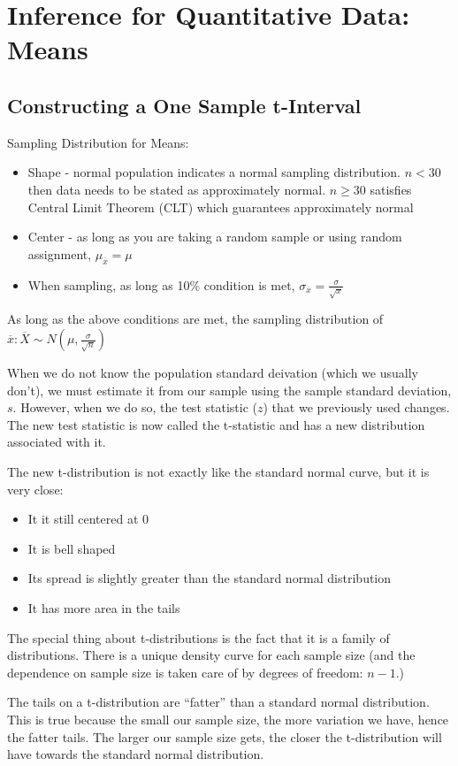 \documentclass[../stats.tex]{subfiles}
\begin{document}
\chapter{Inference for Quantitative Data: Means}
\section{Constructing a One Sample t-Interval}
Sampling Distribution for Means:
\begin{itemize}
    \item Shape - normal population indicates a normal sampling distribution. $n<30$ then data needs to be stated as approximately normal. $n\geq 30$ satisfies Central Limit Theorem (CLT) which guarantees approximately normal 
    \item Center - as long as you are taking a random sample or using random assignment, $\mu_{\overline{x}}=\mu$
    \item When sampling, as long as 10\% condition is met, $\sigma_{\overline{x}}=\frac{\sigma}{\sqrt{x}}$
\end{itemize}

As long as the above conditions are met, the sampling distribution of $\overline{x}: \overline{X} \sim N\left(\mu,\frac{\sigma}{\sqrt{n}}\right)$

When we do not know the population standard deivation (which we usually don't), we must estimate it from our sample using the sample standard deviation, $s$. However, when we do so, 
the test statistic ($z$) that we previously used changes. The new test statistic is now called the t-statistic and has a new distribution associated with it.

The new t-distribution is not exactly like the standard normal curve, but it is very close:
\begin{itemize}
    \item It it still centered at 0 
    \item It is bell shaped 
    \item Its spread is slightly greater than the standard normal distribution 
    \item It has more area in the tails 
\end{itemize}

The special thing about t-distributions is the fact that it is a family of distributions. There is a unique density curve for each sample size (and the dependence on sample size is taken care of by degrees of freedom: $n-1$.)

The tails on a t-distribution are ``fatter'' than a standard normal distribution. This is true because the small our sample size, the more variation we have, hence the fatter tails. The larger our sample size gets, the closer the t-distribution will have towards the standard normal distribution.
\end{document}
